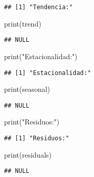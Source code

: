 \documentclass[
]{book}
\newenvironment{Shaded}{\begin{snugshade}}{\end{snugshade}}
\newcommand{\FunctionTok}[1]{\textcolor[rgb]{0.00,0.00,0.00}{#1}}
\newcommand{\NormalTok}[1]{#1}
\newcommand{\StringTok}[1]{\textcolor[rgb]{0.31,0.60,0.02}{#1}}
\begin{document}
\begin{verbatim}
## [1] "Tendencia:"
\end{verbatim}

\begin{Shaded}
\begin{Highlighting}[]
\FunctionTok{print}\NormalTok{(trend)}
\end{Highlighting}
\end{Shaded}

\begin{verbatim}
## NULL
\end{verbatim}

\begin{Shaded}
\begin{Highlighting}[]
\FunctionTok{print}\NormalTok{(}\StringTok{"Estacionalidad:"}\NormalTok{)}
\end{Highlighting}
\end{Shaded}

\begin{verbatim}
## [1] "Estacionalidad:"
\end{verbatim}

\begin{Shaded}
\begin{Highlighting}[]
\FunctionTok{print}\NormalTok{(seasonal)}
\end{Highlighting}
\end{Shaded}

\begin{verbatim}
## NULL
\end{verbatim}

\begin{Shaded}
\begin{Highlighting}[]
\FunctionTok{print}\NormalTok{(}\StringTok{"Residuos:"}\NormalTok{)}
\end{Highlighting}
\end{Shaded}

\begin{verbatim}
## [1] "Residuos:"
\end{verbatim}

\begin{Shaded}
\begin{Highlighting}[]
\FunctionTok{print}\NormalTok{(residuals)}
\end{Highlighting}
\end{Shaded}

\begin{verbatim}
## NULL
\end{verbatim}
\end{document}
